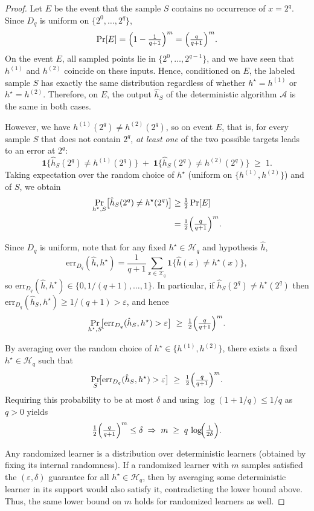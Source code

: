 \documentclass{article}
\newcommand{\cX}{\mathcal{X}}
\newcommand{\cH}{\mathcal{H}}
\newcommand{\cA}{\mathcal{A}}
\theoremstyle{plain}
\theoremstyle{definition}
\theoremstyle{remark}
\begin{document}
\begin{proof}
	Let $E$ be the event that the sample $S$ contains no occurrence of
	$x=2^q$. Since $D_q$ is uniform on $\{2^0,\dots,2^q\}$,
	\[
	\Pr[E] = \Bigl(1 - \tfrac{1}{q+1}\Bigr)^m
	= \Bigl(\tfrac{q}{q+1}\Bigr)^m.
	\]
	On the event $E$, all sampled points lie in $\{2^0,\dots,2^{q-1}\}$,
	and we have seen that $h^{(1)}$ and $h^{(2)}$ coincide on these inputs.
	Hence, conditioned on $E$, the labeled sample $S$ has exactly the same
	distribution regardless of whether $h^\star=h^{(1)}$ or
	$h^\star=h^{(2)}$. Therefore, on $E$, the output $\hat h_S$ of the
	deterministic algorithm $\cA$ is the same in both cases.
	
	However, we have $h^{(1)}(2^q)\ne h^{(2)}(2^q)$, so on event $E$, that is, for every sample $S$ that does not contain $2^q$,
	\emph{at least one} of the two possible targets leads to an error at
	$2^q$:
\[
\mathbf{1}\{\hat h_S(2^q)\ne h^{(1)}(2^q)\}
\;+\;
\mathbf{1}\{\hat h_S(2^q)\ne h^{(2)}(2^q)\}
\;\ge\; 1.
\]
	Taking expectation over the random choice of $h^\star$ (uniform on
	$\{h^{(1)},h^{(2)}\}$) and of $S$, we obtain
	\begin{align*}
		\Pr_{h^\star,S}\bigl[\hat h_S(2^q)\ne h^\star(2^q)\bigr]
		&\ge \tfrac{1}{2}\Pr[E] \\
		&= \tfrac{1}{2}\Bigl(\tfrac{q}{q+1}\Bigr)^m.
	\end{align*}
	


Since $D_q$ is uniform, note that for any fixed $h^\star\in\cH_q$ and hypothesis $\hat h$,
\[
\mathrm{err}_{D_q}(\hat h,h^\star)
= \frac{1}{q+1}\sum_{x\in\cX_q}
\mathbf{1}\{\hat h(x)\ne h^\star(x)\},
\]
so $\mathrm{err}_{D_q}(\hat h,h^\star)\in\{0,1/(q+1),\dots,1\}$. In
particular, if $\hat h_S(2^q)\ne h^\star(2^q)$ then
$\mathrm{err}_{D_q}(\hat h_S,h^\star)\ge 1/(q+1)>\varepsilon$, and hence
\[
\Pr_{h^\star,S}\!\bigl[
\mathrm{err}_{D_q}(\hat h_S,h^\star)>\varepsilon
\bigr]
\;\ge\; \tfrac12\Bigl(\tfrac{q}{q+1}\Bigr)^{m}.
\]

By averaging over the random choice of
$h^\star\in\{h^{(1)},h^{(2)}\}$, there exists a fixed
$h^\star\in\cH_q$ such that
\[
\Pr_S\!\bigl[
\mathrm{err}_{D_q}(\hat h_S,h^\star)>\varepsilon
\bigr]
\;\ge\; \tfrac12\Bigl(\tfrac{q}{q+1}\Bigr)^{m}.
\]
Requiring this probability to be at most $\delta$ and using $\log(1+1/q)\le 1/q$ as $q > 0$ yields
\[
\tfrac12\Bigl(\tfrac{q}{q+1}\Bigr)^{m} \le \delta
\;\Rightarrow\;
m \;\ge\; q\,\log\!\Bigl(\tfrac{1}{2\delta}\Bigr).
\]



Any randomized learner is a distribution over deterministic learners
(obtained by fixing its internal randomness). If a randomized learner
with $m$ samples satisfied the $(\varepsilon,\delta)$ guarantee for all
$h^\star\in\cH_q$, then by averaging some deterministic learner in its
support would also satisfy it, contradicting the lower bound above.
Thus, the same lower bound on $m$ holds for randomized learners as well.
\end{proof}
\end{document}
